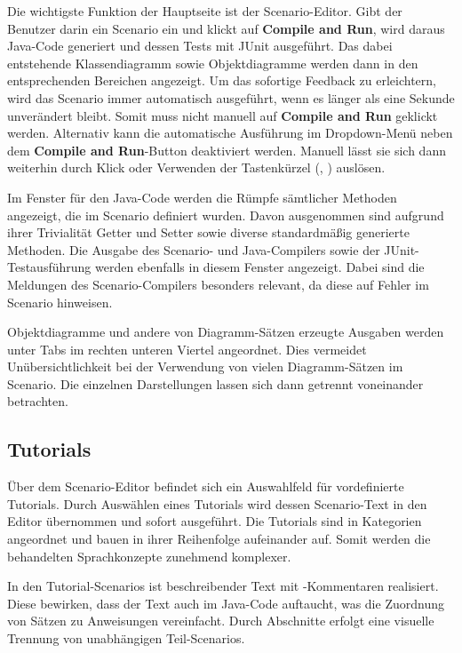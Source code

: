 Die wichtigste Funktion der Hauptseite ist der Scenario-Editor.
Gibt der Benutzer darin ein Scenario ein und klickt auf \textbf{Compile and Run}, wird daraus Java-Code generiert und dessen Tests mit JUnit ausgeführt.
Das dabei entstehende Klassendiagramm sowie Objektdiagramme werden dann in den entsprechenden Bereichen angezeigt.
Um das sofortige Feedback zu erleichtern, wird das Scenario immer automatisch ausgeführt, wenn es länger als eine Sekunde unverändert bleibt.
Somit muss nicht manuell auf \textbf{Compile and Run} geklickt werden.
Alternativ kann die automatische Ausführung im Dropdown-Menü neben dem \textbf{Compile and Run}-Button deaktiviert werden.
Manuell lässt sie sich dann weiterhin durch Klick oder Verwenden der Tastenkürzel (, ) auslösen.

Im Fenster für den Java-Code werden die Rümpfe sämtlicher Methoden angezeigt, die im Scenario definiert wurden.
Davon ausgenommen sind aufgrund ihrer Trivialität Getter und Setter sowie diverse standardmäßig generierte Methoden.
Die Ausgabe des Scenario- und Java-Compilers sowie der JUnit-Testausführung werden ebenfalls in diesem Fenster angezeigt.
Dabei sind die Meldungen des Scenario-Compilers besonders relevant, da diese auf Fehler im Scenario hinweisen.

Objektdiagramme und andere von Diagramm-Sätzen erzeugte Ausgaben werden unter Tabs im rechten unteren Viertel angeordnet.
Dies vermeidet Unübersichtlichkeit bei der Verwendung von vielen Diagramm-Sätzen im Scenario.
Die einzelnen Darstellungen lassen sich dann getrennt voneinander betrachten.

\subsection{Tutorials}\label{subsec:tutorials}

Über dem Scenario-Editor befindet sich ein Auswahlfeld für vordefinierte Tutorials.
Durch Auswählen eines Tutorials wird dessen Scenario-Text in den Editor übernommen und sofort ausgeführt.
Die Tutorials sind in Kategorien angeordnet und bauen in ihrer Reihenfolge aufeinander auf.
Somit werden die behandelten Sprachkonzepte zunehmend komplexer.

In den Tutorial-Scenarios ist beschreibender Text mit \code{//}-Kommentaren realisiert.
Diese bewirken, dass der Text auch im Java-Code auftaucht, was die Zuordnung von Sätzen zu Anweisungen vereinfacht.
Durch Abschnitte erfolgt eine visuelle Trennung von unabhängigen Teil-Scenarios.

